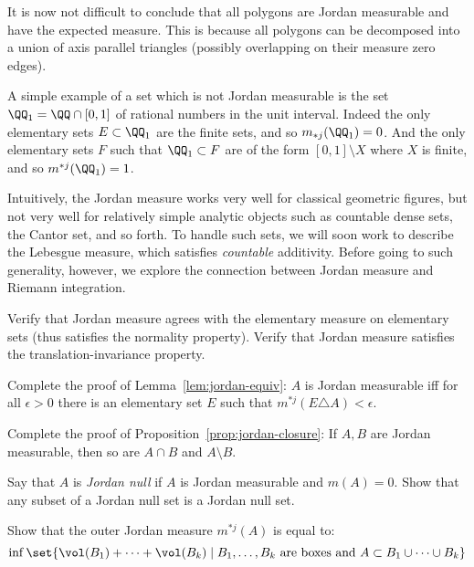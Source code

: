 It is now not difficult to conclude that all polygons are Jordan measurable and have the expected measure. This is because all polygons can be decomposed into a union of axis parallel triangles (possibly overlapping on their measure zero edges).

A simple example of a set which is not Jordan measurable is the set $\QQ_1=\QQ\cap[0,1]$ of rational numbers in the unit interval. Indeed the only elementary sets $E\subset\QQ_1$ are the finite sets, and so $m_{*j}(\QQ_1)=0$. And the only elementary sets $F$ such that $\QQ_1\subset F$ are of the form $[0,1]\setminus X$ where $X$ is finite, and so $m^{*j}(\QQ_1)=1$.

Intuitively, the Jordan measure works very well for classical geometric figures, but not very well for relatively simple analytic objects such as countable dense sets, the Cantor set, and so forth. To handle such sets, we will soon work to describe the Lebesgue measure, which satisfies \emph{countable} additivity. Before going to such generality, however, we explore the connection between Jordan measure and Riemann integration.

\begin{exerc}[Tao, Ex 1.1.6(4)(6)]
  Verify that Jordan measure agrees with the elementary measure on elementary sets (thus satisfies the normality property). Verify that Jordan measure satisfies the translation-invariance property.
\end{exerc}

\begin{exerc}
  Complete the proof of Lemma~\ref{lem:jordan-equiv}: $A$ is Jordan measurable iff for all $\epsilon>0$ there is an elementary set $E$ such that $m^{*j}(E\triangle A)<\epsilon$.
\end{exerc}

\begin{exerc}[Tao, Ex 1.1.6(1)]
  Complete the proof of Proposition~\ref{prop:jordan-closure}: If $A,B$ are Jordan measurable, then so are $A\cap B$ and $A\setminus B$.
\end{exerc}

\begin{exerc}[Tao, Ex 1.1.12]
  Say that $A$ is \emph{Jordan null} if $A$ is Jordan measurable and $m(A)=0$. Show that any subset of a Jordan null set is a Jordan null set.
\end{exerc}

\begin{exerc}
  Show that the outer Jordan measure $m^{*j}(A)$ is equal to:
  \[\inf\set{\vol(B_1)+\cdots+\vol(B_k)\mid B_1,\ldots,B_k\text{ are boxes and }A\subset B_1\cup\cdots\cup B_k}
  \]
\end{exerc}

